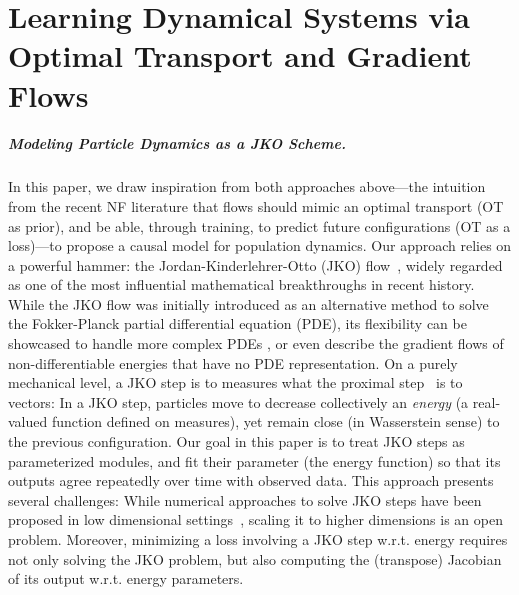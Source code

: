 \chapter[Learning Dynamical Systems via OT and Gradient Flows]{Learning Dynamical Systems via Optimal Transport and Gradient Flows}
\label{cha:neural_pde}



\paragraph{Modeling Particle Dynamics as a JKO Scheme.} In this paper, we draw inspiration from both approaches above---the intuition from the recent NF literature that flows should mimic an optimal transport (OT as prior), and be able, through training, to predict future configurations (OT as a loss)---to propose a causal model for population dynamics. Our approach relies on a powerful hammer: the Jordan-Kinderlehrer-Otto (JKO) flow~\citep{jordan1998variational}, widely regarded as one of the most influential mathematical breakthroughs in recent history. While the JKO flow was initially introduced as an alternative method to solve the Fokker-Planck partial differential equation (PDE), its flexibility can be showcased to handle more complex PDEs \cite[\S4.7]{santambrogio2017euclidean}, or even describe the gradient flows of non-differentiable energies that have no PDE representation.
On a purely mechanical level, a JKO step is to measures what the proximal step~\citep{combettes2011proximal} is to vectors: In a JKO step, particles move to decrease collectively an {\em energy} (a real-valued function defined on measures), yet remain close (in Wasserstein sense) to the previous configuration. Our goal in this paper is to treat JKO steps as parameterized modules, and fit their parameter (the energy function) so that its outputs agree repeatedly over time with observed data. 
This approach presents several challenges: While numerical approaches to solve JKO steps have been proposed in low dimensional settings~\citep{burger2010, carrillo2021primal, peyre2015entropic,benamou2016augmented}, scaling it to higher dimensions is an open problem. Moreover, minimizing a loss involving a JKO step w.r.t. energy requires not only solving the JKO problem, but also computing the (transpose) Jacobian of its output w.r.t. energy parameters.


